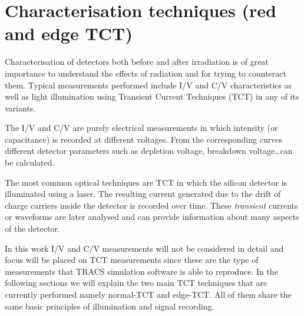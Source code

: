 \clearpage
{}  %
\chapter{Characterisation techniques (red and edge TCT)}
\label{chap:TCT}

Characterisation of detectors both before and after irradiation is of great importance to understand the effects of radiation and for trying to counteract them. Typical measurements performed include I/V and C/V characteristics as well as light illumination using Transient Current Techniques (TCT) in any of its variants. 

The I/V and C/V are purely electrical measurements in which intensity (or capacitance) is recorded at different voltages. From the corresponding curves different detector parameters such as depletion voltage, breakdown voltage\ldots can be calculated. 

The most common optical techniques are TCT in which the silicon detector is illuminated using a laser. The resulting current generated due to the drift of charge carriers inside the detector is recorded over time. These \textit{transient} currents or waveforms are later analysed and can provide information about many aspects of the detector. %

In this work I/V and C/V measurements will not be considered in detail and focus will be placed on TCT measurements since these are the type of measurements that TRACS simulation software is able to reproduce. In the following sections we will explain the two main TCT techniques that are currently performed namely normal-TCT and edge-TCT. All of them share the same basic principles of illumination and signal recording. 

